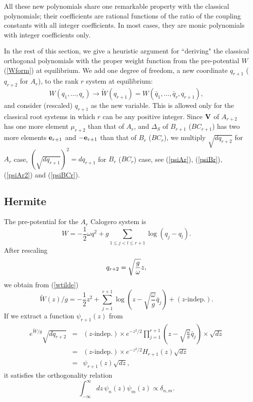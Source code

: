 \documentclass[a4paper,12pt]{article}
\begin{document}
All these new polynomials share one remarkable property with the classical
polynomials; their coefficients are rational functions of the ratio of
the coupling constants with all integer coefficients.
In most cases, they are monic polynomials with integer coefficients only.

In the rest of this section, we give a heuristic argument for ``deriving"
the classical orthogonal polynomials  with the proper weight function from
the pre-potential $W$ (\ref{Wform}) at equilibrium. We add one degree of
freedom, a new coordinate $q_{r+1}$ ($q_{r+2}$ for $A_r$), to the rank $r$
system at equilibrium:
\begin{equation}
   W(q_1,\ldots,q_r)\to
   \widetilde{W}(q_{r+1})=W(\bar{q}_1,\ldots,\bar{q}_r,q_{r+1}),
   \label{wtilde}
\end{equation}
and consider (rescaled) $q_{r+1}$ as the new variable. This is allowed
only for the classical root systems in which $r$ can be any positive integer.
Since ${\bf V}$ of $A_{r+2}$ has one more element $\mu_{r+2}$ than that 
of $A_r$, and $\Delta_S$ of $B_{r+1}$ ($BC_{r+1}$) has two more 
elements ${\bf e}_{r+1}$ and $-{\bf e}_{r+1}$ than that of $B_{r}$ ($BC_{r}$),
we multiply $\sqrt{dq_{r+2}}$ for $A_r$ case,
$(\sqrt{dq_{r+1}})^2=dq_{r+1}$ for $B_r$ ($BC_r$) case,
see (\ref{psiAr}), (\ref{psiBr}), (\ref{psiAr2}) and (\ref{psiBCr}).

\subsection{Hermite}

The pre-potential for the $A_r$ Calogero system is
\[
   W=-\frac12\omega q^2+g\sum_{1\leq j<l\leq r+1}\log(q_j-q_l).
\]
After rescaling
\begin{equation}
q_{r+2}=\sqrt{g\over{\omega}}z,
\end{equation}
we obtain from (\ref{wtilde})
\begin{equation}
   \widetilde{W}(z)/g=
   -\frac12 z^2+\sum_{j=1}^{r+1}\log(z-\sqrt{\frac{\omega}{g}}\bar{q}_j)
   +(\mbox{$z$-indep.}).
\end{equation}
If we extract a function $\psi_{r+1}(z)$ from
\begin{eqnarray}
   e^{\widetilde{W}/g}\sqrt{dq_{r+2}}&\!\!=\!\!&(\mbox{$z$-indep.})\times
   e^{-z^2/2}\prod_{j=1}^{r+1}(z-\sqrt{\frac{\omega}{g}}\bar{q}_j)
   \times\sqrt{dz}\nonumber\\
%
   &\!\!=\!\!&(\mbox{$z$-indep.})\times e^{-z^2/2}H_{r+1}(z)\sqrt{dz}
   \nonumber\\
%
   &\!\!=\!\!&\psi_{r+1}(z)\sqrt{dz},
   \label{psiAr}
\end{eqnarray}
it satisfies the orthogonality relation
\[
   \int_{-\infty}^{\infty}dz\,\psi_n(z)\psi_m(z)\propto\delta_{n,m}.
\]
\end{document}
